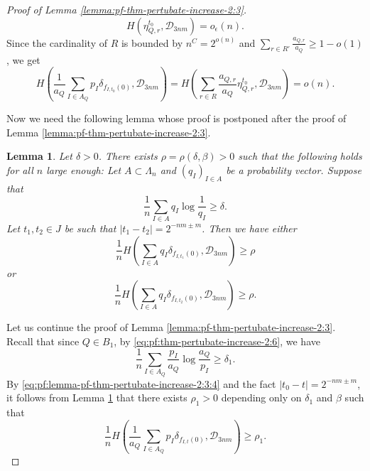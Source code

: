 \documentclass[a4paper,11pt]{amsart}
\newtheorem{lemma}[theorem]{Lemma}
\theoremstyle{definition}
\numberwithin{equation}{section}
\def\D{\mathcal{D}}
\begin{document}
\begin{proof}[Proof of Lemma \ref{lemma:pf-thm-pertubate-increase-2:3}]
\begin{equation}\label{eq:pf:lemma-pf-thm-pertubate-increase-2:3:3}
H(\eta_{Q,r}^{t_0},\D_{3nm}) = o_\epsilon(n).
\end{equation}
Since the cardinality of $R$ is bounded by  $n^C=2^{o(n)}$ and $\sum_{r\in R'}\frac{a_{Q,r}}{a_Q}\ge 1-o(1)$,  we get 
\begin{equation}\label{eq:pf:lemma-pf-thm-pertubate-increase-2:3:4}
H\left(\frac{1}{a_{Q}}\sum_{I\in A_{Q}}p_I \delta_{f_{I,t_0}(0)},\D_{3nm}\right) = H\left(\sum_{r\in R}\frac{a_{Q,r}}{a_Q}\eta_{Q,r}^{t_0},\D_{3nm}\right) = o(n).
\end{equation}

Now we need the following lemma whose proof is postponed after the proof of Lemma \ref{lemma:pf-thm-pertubate-increase-2:3}. 
\begin{lemma}\label{lemma:pf-thm-pertubate-increase-2:4}
Let $\delta>0$. There exists $\rho=\rho(\delta,\beta)>0$ such that the following holds for all $n$ large enough: Let $A\subset \Lambda_n$ and $(q_I)_{I\in A}$ be a probability vector.  Suppose that 
\[
\frac{1}{n}\sum_{I\in A} q_I\log \frac{1}{q_I} \ge \delta.
\]
Let $t_1,t_2\in J$ be such that $|t_1-t_2|=2^{-nm\pm m}$.  Then we have either 
\[
\frac{1}{n}H\left(\sum_{I\in A}q_I\delta_{f_{I,t_1}(0)}, \D_{3nm}\right) \ge \rho
\]
or 
\[
\frac{1}{n}H\left(\sum_{I\in A}q_I\delta_{f_{I,t_2}(0)}, \D_{3nm}\right) \ge \rho.
\]
\end{lemma}

Let us continue the proof of Lemma \ref{lemma:pf-thm-pertubate-increase-2:3}.  Recall that since $Q\in B_1$, by \eqref{eq:pf:thm-pertubate-increase-2:6},  we have
\[
\frac{1}{n}\sum_{I\in A_Q}\frac{p_I}{a_Q}\log \frac{a_Q}{p_I} \ge \delta_1.
\]
By \eqref{eq:pf:lemma-pf-thm-pertubate-increase-2:3:4} and the fact $|t_0-t|=2^{-nm\pm m}$,  it follows from Lemma \ref{lemma:pf-thm-pertubate-increase-2:4} that there exists $\rho_1>0$ depending only on $\delta_1$ and $\beta$ such that 
\begin{equation}\label{eq:pf:lemma-pf-thm-pertubate-increase-2:3:5}
\frac{1}{n}H\left(\frac{1}{a_{Q}}\sum_{I\in A_{Q}}p_I \delta_{f_{I,t}(0)},\D_{3nm}\right)  \ge \rho_1.
\end{equation}


\end{proof}
\end{document}
